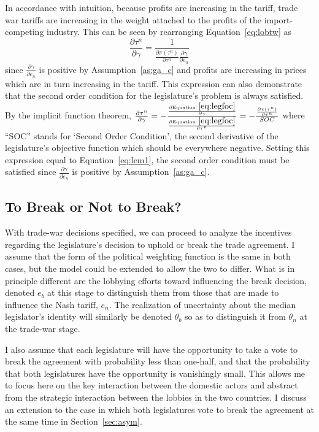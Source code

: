 \documentclass[10pt]{article}
\newcommand{\ve}{\theta}
\newcommand{\ga}{\gamma}
\begin{document}
In accordance with intuition, because profits are increasing in the tariff, trade war tariffs are increasing in the weight attached to the profits of the import-competing industry. This can be seen by rearranging Equation~\ref{eq:lobtw} as 
\begin{equation}
  \frac{\partial \tau^n}{\partial \ga} = \frac{1}{\frac{\partial \pi(\tau^n)}{\partial \tau^n} \frac{\partial \ga}{\partial e_n}}
	\label{eq:lem1}
\end{equation}
since $\frac{\partial \ga}{\partial e_n}$ is positive by Assumption~\ref{as:ga_c} and profits are increasing in prices which are in turn increasing in the tariff. This expression can also demonstrate that the second order condition for the legislature's problem is always satisfied. By the implicit function theorem, $\frac{\partial \tau^n}{\partial \ga} = -\frac{\frac{\partial \text{Equation}~\ref{eq:legfoc}}{\partial \ga}}{\frac{\partial \text{Equation}~\ref{eq:legfoc}}{\partial \tau^n}} = -\frac{\frac{\partial \pi(\tau^n)}{\partial \tau^n}}{SOC}$ where ``SOC'' stands for `Second Order Condition', the second derivative of the legislature's objective function which should be everywhere negative. Setting this expression equal to Equation~\ref{eq:lem1}, the second order condition must be satisfied since $\frac{\partial \ga}{\partial e_n}$ is positive by Assumption~\ref{as:ga_c}.


\bigskip
\subsection{To Break or Not to Break?}
With trade-war decisions specified, we can proceed to analyze the incentives regarding the legislature's decision to uphold or break the trade agreement. I assume that the form of the political weighting function is the same in both cases, but the model could be extended to allow the two to differ. What is in principle different are the lobbying efforts toward influencing the break decision, denoted $e_b$ at this stage to distinguish them from those that are made to influence the Nash tariff, $e_n$. The realization of uncertainty about the median legislator's identity will similarly be denoted $\ve_b$ so as to distinguish it from $\ve_n$ at the trade-war stage. 

I also assume that each legislature will have the opportunity to take a vote to break the agreement with probability less than one-half, and that the probability that both legislatures have the opportunity is vanishingly small. This allows me to focus here on the key interaction between the domestic actors and abstract from the strategic interaction between the lobbies in the two countries. I discuss an extension to the case in which both legislatures vote to break the agreement at the same time in Section~\ref{sec:asym}.
\end{document}
